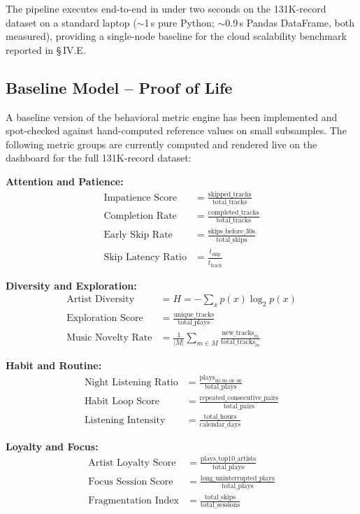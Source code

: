 \documentclass[conference]{IEEEtran}
\begin{document}
The pipeline executes end-to-end in under two seconds on the 131K-record dataset on a standard laptop ($\sim$1\,s pure Python; $\sim$0.9\,s Pandas DataFrame, both measured), providing a single-node baseline for the cloud scalability benchmark reported in \S\,IV.E.

\subsection{Baseline Model -- Proof of Life}

A baseline version of the behavioral metric engine has been implemented and spot-checked against hand-computed reference values on small subsamples. The following metric groups are currently computed and rendered live on the dashboard for the full 131K-record dataset:

\textbf{Attention and Patience:}
\begin{align}
\text{Impatience Score} &= \frac{\text{skipped\_tracks}}{\text{total\_tracks}} \\
\text{Completion Rate} &= \frac{\text{completed\_tracks}}{\text{total\_tracks}} \\
\text{Early Skip Rate} &= \frac{\text{skips\_before\_30s}}{\text{total\_skips}} \\
\text{Skip Latency Ratio} &= \frac{\overline{t_{\text{skip}}}}{\overline{t_{\text{track}}}}
\end{align}

\textbf{Diversity and Exploration:}
\begin{align}
\text{Artist Diversity} &= H = -\sum_{x} p(x)\log_2 p(x) \\
\text{Exploration Score} &= \frac{\text{unique\_tracks}}{\text{total\_plays}} \\
\text{Music Novelty Rate} &= \frac{1}{|M|}\sum_{m \in M}\frac{\text{new\_tracks}_m}{\text{total\_tracks}_m}
\end{align}

\textbf{Habit and Routine:}
\begin{align}
\text{Night Listening Ratio} &= \frac{\text{plays}_{00{:}00\text{--}06{:}00}}{\text{total\_plays}} \\
\text{Habit Loop Score} &= \frac{\text{repeated\_consecutive\_pairs}}{\text{total\_pairs}} \\
\text{Listening Intensity} &= \frac{\text{total\_hours}}{\text{calendar\_days}}
\end{align}

\textbf{Loyalty and Focus:}
\begin{align}
\text{Artist Loyalty Score} &= \frac{\text{plays\_top10\_artists}}{\text{total\_plays}} \\
\text{Focus Session Score} &= \frac{\text{long\_uninterrupted\_plays}}{\text{total\_plays}} \\
\text{Fragmentation Index} &= \frac{\text{total\_skips}}{\text{total\_sessions}}
\end{align}
\end{document}
